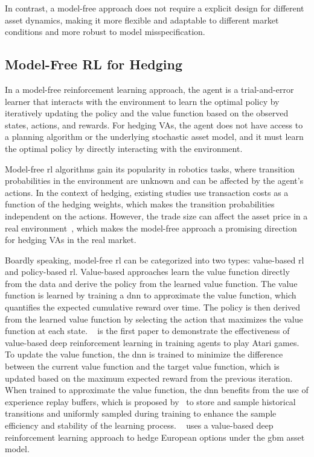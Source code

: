 In contrast, a model-free approach does not require a explicit design for different asset dynamics, making it more flexible and adaptable to different market conditions and more robust to model misspecification.

\subsection{Model-Free RL for Hedging}
    
In a model-free reinforcement learning approach, the agent is a trial-and-error learner that interacts with the environment to learn the optimal policy by iteratively updating the policy and the value function based on the observed states, actions, and rewards.
For hedging VAs, the agent does not have access to a planning algorithm or the underlying stochastic asset model, and it must learn the optimal policy by directly interacting with the environment.

Model-free \gls{rl} algorithms gain its popularity in robotics tasks, where transition probabilities in the environment are unknown and can be affected by the agent's actions.
In the context of hedging, existing studies use transaction costs as a function of the hedging weights, which makes the transition probabilities independent on the actions.
However, the trade size can affect the asset price in a real environment~\citep{hasbrouck1991measuring}, which makes the model-free approach a promising direction for hedging VAs in the real market.

Boardly speaking, model-free \gls{rl} can be categorized into two types: value-based \gls{rl} and policy-based \gls{rl}.
Value-based approaches learn the value function directly from the data and derive the policy from the learned value function. 
The value function is learned by training a \gls{dnn} to approximate the value function, which quantifies the expected cumulative reward over time. 
The policy is then derived from the learned value function by selecting the action that maximizes the value function at each state. 
~\cite{mnih2015human} is the first paper to demonstrate the effectiveness of value-based deep reinforcement learning in training agents to play Atari games.
To update the value function, the \gls{dnn} is trained to minimize the difference between the current value function and the target value function, which is updated based on the maximum expected reward from the previous iteration.
When trained to approximate the value function, the \gls{dnn} benefits from the use of experience replay buffers, which is proposed by~\cite{lin1992self} to store and sample historical transitions and uniformly sampled during training to enhance the sample efficiency and stability of the learning process.
~\cite{kolm2019dynamic} uses a value-based deep reinforcement learning approach to hedge European options under the \gls{gbm} asset model.

